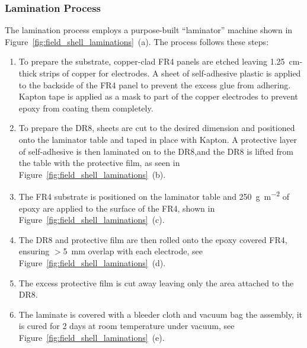 \documentclass[a4paper,12pt]{article}
\newcommand{\DR}{DR8}
\begin{document}
\subsubsection{Lamination Process} 
\label{sec:lamination}

The lamination process employs a purpose-built ``laminator'' machine shown in Figure~\ref{fig:field_shell_laminations}~(a). 
The process follows these steps:
\begin{enumerate}
 
	\item To prepare the substrate, copper-clad FR4 panels are etched leaving \SI{1.25}{\centi\metre}-thick strips of copper for electrodes. 
	A sheet of self-adhesive plastic is applied to the backside of the FR4 panel to prevent the excess glue from adhering. 
	Kapton tape is applied as a mask to part of the copper electrodes to prevent epoxy from coating them completely.

	\item To prepare the {\DR}, sheets are cut to the desired dimension and positioned onto the laminator table and taped in place with Kapton.
	A protective layer of self-adhesive is then laminated on to the {\DR},and the {\DR} is lifted from the table with the protective film, as seen in Figure~\ref{fig:field_shell_laminations}~(b).

	\item The FR4 substrate is positioned on the laminator table and \SI{250}{\gram\per\meter\squared} of epoxy are applied to the surface of the FR4, shown in Figure~\ref{fig:field_shell_laminations}~(c).

	\item The {\DR} and protective film are then rolled onto the epoxy covered FR4, ensuring $>$\SI{5}{\milli\meter} overlap with each electrode, see Figure~\ref{fig:field_shell_laminations}~(d).

	\item The excess protective film is cut away leaving only the area attached to the {\DR}.

	\item The laminate is covered with a bleeder cloth and vacuum bag the assembly, it is cured for 2 days at room temperature under vacuum, see Figure~\ref{fig:field_shell_laminations}~(e).

\end{enumerate}
\end{document}
